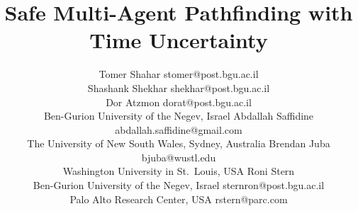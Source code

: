 \documentclass[jair,twoside,11pt,theapa]{article}
\begin{document}
\title{Safe Multi-Agent Pathfinding with Time Uncertainty}



\author{\name Tomer Shahar \email stomer@post.bgu.ac.il  \\
        \name Shashank Shekhar \email shekhar@post.bgu.ac.il \\ 
        \name Dor Atzmon \email  dorat@post.bgu.ac.il \\
              \addr Ben-Gurion University of the Negev, Israel
       \AND
       \name Abdallah Saffidine \email abdallah.saffidine@gmail.com \\
       \addr The University of New South Wales, Sydney, Australia
       \AND
       \name Brendan Juba \email bjuba@wustl.edu \\
       \addr Washington University in St.\ Louis, USA
        \AND 
        \name Roni Stern  \\
       \addr Ben-Gurion University of the Negev, Israel \email sternron@post.bgu.ac.il\\
       \addr Palo Alto Research Center, USA \email rstern@parc.com}



\maketitle
\end{document}
